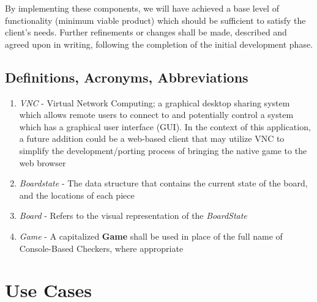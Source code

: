 \documentclass[letterpaper]{article}
\begin{document}
By implementing these components, we will have achieved a base
level of functionality (minimum viable product) which should be
sufficient to satisfy the client's needs. Further refinements or
changes shall be made, described and agreed upon in writing,
following the completion of the initial development phase.


\subsection{Definitions, Acronyms, Abbreviations}
\label{sec:intro_definitions}

\begin{enumerate}
    \item \emph{VNC} - Virtual Network Computing; a graphical
          desktop sharing system which allows remote users to
          connect to and potentially control a system which has
          a graphical user interface (GUI). In the context of
          this application, a future addition could be a
          web-based client that may utilize VNC to simplify the
          development/porting process of bringing the native
          game to the web browser
    
    \item \emph{Boardstate} - The data structure that contains
          the current state of the board, and the locations of
          each piece
    
    \item \emph{Board} - Refers to the visual representation of
          the \emph{BoardState}
           
    \item \emph{Game} - A capitalized \textbf{Game} shall be
          used in place of the full name of Console-Based
          Checkers, where appropriate
\end{enumerate}



\section{Use Cases}
\label{sec:cases}
\end{document}

